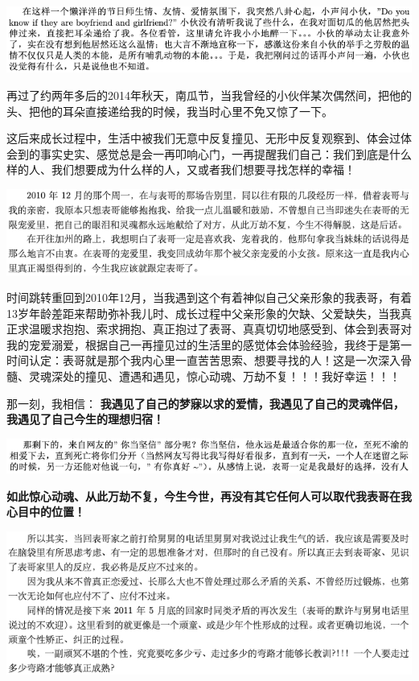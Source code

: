 \documentclass[9pt, b5paper]{article}
\begin{document}
\begin{center}
\includegraphics[width=.9\linewidth]{./pic/backups_plans_20210422_114817.png}
\end{center}

再过了约两年多后的2014年秋天，南瓜节，当我曾经的小伙伴某次偶然间，把他的头、把他的耳朵直接递给我的时候，我当时心里不免又惊了一下。

这后来成长过程中，生活中被我们无意中反复撞见、无形中反复观察到、体会过体会到的事实史实、感觉总是会一再叩响心门，一再提醒我们自己：我们到底是什么样的人、我们想要成为什么样的人，又或者我们想要寻找怎样的幸福！

\begin{center}
\includegraphics[width=.9\linewidth]{./pic/backups_plans_20210423_111600.png}
\end{center}

时间跳转重回到2010年12月，当我遇到这个有着神似自己父亲形象的我表哥，有着13岁年龄差距来帮助弥补我儿时、成长过程中父亲形象的欠缺、父爱缺失，当我真正求温暖求抱抱、索求拥抱、真正抱过了表哥、真真切切地感受到、体会到表哥对我的宠爱溺爱，根据自己一再撞见过的生活里的感觉体会体验经验，我终于是第一时间认定：表哥就是那个我内心里一直苦苦思索、想要寻找的人！这是一次深入骨髓、灵魂深处的撞见、遭遇和遇见，惊心动魂、万劫不复！！！我好幸运！！！

那一刻，我相信： \textbf{我遇见了自己的梦寐以求的爱情，我遇见了自己的灵魂伴侣，我遇见了自己今生的理想归宿！}

\begin{center}
\includegraphics[width=.9\linewidth]{./pic/backups_plans_20210423_112236.png}
\end{center}

\textbf{如此惊心动魂、从此万劫不复，今生今世，再没有其它任何人可以取代我表哥在我心目中的位置！}

\begin{center}
\includegraphics[width=.9\linewidth]{./pic/backups_plans_20210423_102533.png}
\end{center}
\end{document}
